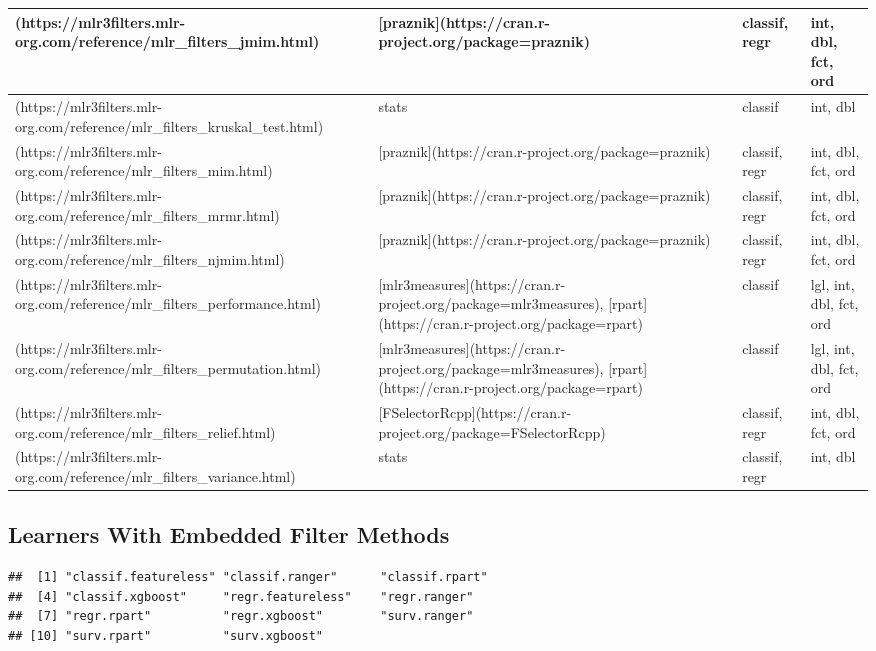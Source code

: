 \documentclass[
]{scrbook}
\begin{document}
\begin{tabular}{l|l|l|l}
\hline
[`jmim`](https://mlr3filters.mlr-org.com/reference/mlr\_filters\_jmim.html) & [praznik](https://cran.r-project.org/package=praznik) & classif, regr & int, dbl, fct, ord\\
\hline
[`kruskal\_test`](https://mlr3filters.mlr-org.com/reference/mlr\_filters\_kruskal\_test.html) & stats & classif & int, dbl\\
\hline
[`mim`](https://mlr3filters.mlr-org.com/reference/mlr\_filters\_mim.html) & [praznik](https://cran.r-project.org/package=praznik) & classif, regr & int, dbl, fct, ord\\
\hline
[`mrmr`](https://mlr3filters.mlr-org.com/reference/mlr\_filters\_mrmr.html) & [praznik](https://cran.r-project.org/package=praznik) & classif, regr & int, dbl, fct, ord\\
\hline
[`njmim`](https://mlr3filters.mlr-org.com/reference/mlr\_filters\_njmim.html) & [praznik](https://cran.r-project.org/package=praznik) & classif, regr & int, dbl, fct, ord\\
\hline
[`performance`](https://mlr3filters.mlr-org.com/reference/mlr\_filters\_performance.html) & [mlr3measures](https://cran.r-project.org/package=mlr3measures), [rpart](https://cran.r-project.org/package=rpart) & classif & lgl, int, dbl, fct, ord\\
\hline
[`permutation`](https://mlr3filters.mlr-org.com/reference/mlr\_filters\_permutation.html) & [mlr3measures](https://cran.r-project.org/package=mlr3measures), [rpart](https://cran.r-project.org/package=rpart) & classif & lgl, int, dbl, fct, ord\\
\hline
[`relief`](https://mlr3filters.mlr-org.com/reference/mlr\_filters\_relief.html) & [FSelectorRcpp](https://cran.r-project.org/package=FSelectorRcpp) & classif, regr & int, dbl, fct, ord\\
\hline
[`variance`](https://mlr3filters.mlr-org.com/reference/mlr\_filters\_variance.html) & stats & classif, regr & int, dbl\\
\hline
\end{tabular}

\hypertarget{fs-filter-embedded-list}{%
\subsection{Learners With Embedded Filter Methods}\label{fs-filter-embedded-list}}

\begin{verbatim}
##  [1] "classif.featureless" "classif.ranger"      "classif.rpart"      
##  [4] "classif.xgboost"     "regr.featureless"    "regr.ranger"        
##  [7] "regr.rpart"          "regr.xgboost"        "surv.ranger"        
## [10] "surv.rpart"          "surv.xgboost"
\end{verbatim}
\end{document}
